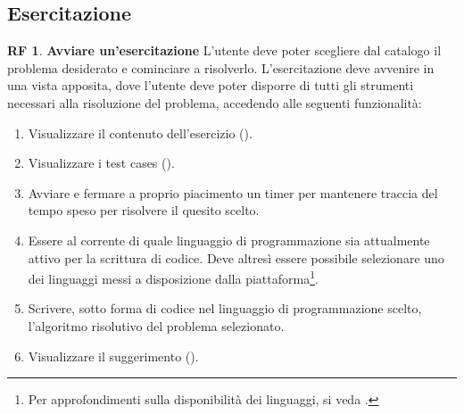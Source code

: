 \documentclass[11pt, a4paper]{article}
\theoremstyle{definition}
\newtheorem{funcreq}{RF} %
\begin{document}
\subsection{Esercitazione}
\begin{funcreq}
\label{exesession}
\textbf{Avviare un'esercitazione }
L'utente deve poter scegliere dal catalogo il problema desiderato e cominciare
a risolverlo. L'esercitazione deve avvenire in una vista apposita, dove
l'utente deve poter disporre di tutti gli strumenti necessari alla risoluzione
del problema, accedendo alle seguenti funzionalità:
\begin{enumerate}
    \item Visualizzare il contenuto dell'esercizio (\textcolor{blue}{}).
    
    \item Visualizzare i test cases (\textcolor{blue}{}).

    \item Avviare e fermare a proprio piacimento un timer per mantenere traccia
    del tempo speso per risolvere il quesito scelto.
    
    \item Essere al corrente di quale linguaggio di programmazione sia
    attualmente attivo per la scrittura di codice. Deve altresì essere 
    possibile selezionare uno dei linguaggi messi a disposizione dalla
    piattaforma\footnote{Per approfondimenti sulla disponibilità dei
    linguaggi, si veda \textcolor{blue}{}.}.

    \item Scrivere, sotto forma di codice nel linguaggio di programmazione
    scelto, l'algoritmo risolutivo del problema selezionato.

    \item Visualizzare il suggerimento (\textcolor{blue}{}).
\end{enumerate}
\end{funcreq}


\end{document}
